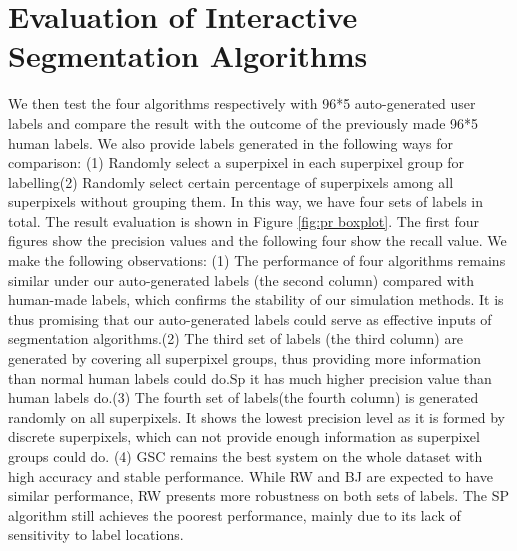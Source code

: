 \documentclass[runningheads,a4paper]{llncs}
\begin{document}
\section{Evaluation of Interactive Segmentation Algorithms}

We then test the four algorithms respectively with 96*5 auto-generated user labels and compare the result with the outcome of the previously made 96*5 human labels. We also provide labels generated in the following ways for comparison: (1) Randomly select a superpixel in each superpixel group for labelling(2) Randomly select certain percentage of superpixels among all superpixels without grouping them. In this way, we have four sets of labels in total. The result evaluation is shown in Figure \ref{fig:pr boxplot}. The first four figures show the precision values and the following four show the recall value. We make the following observations: (1) The performance of four algorithms remains similar under our auto-generated labels (the second column) compared with human-made labels, which confirms the stability of our simulation methods. It is thus promising that our auto-generated labels could serve as effective inputs of segmentation algorithms.(2) The third set of labels (the third column) are generated by covering all superpixel groups, thus providing more information than normal human labels could do.Sp it has much higher precision value than human labels do.(3) The fourth set of labels(the fourth column) is generated randomly on all superpixels. It shows the lowest precision level as it is formed by discrete superpixels, which can not provide enough information as superpixel groups could do.  (4) GSC \cite{gulshan2010geodesic} remains the best system on the whole dataset with high accuracy and stable performance. While RW \cite {grady2006random} and BJ \cite{boykov2001interactive}are expected to have similar performance, RW presents more robustness on both sets of labels. The SP\cite{bai2007geodesic} algorithm still achieves the poorest performance, mainly due to its lack of sensitivity to label locations.
\end{document}
